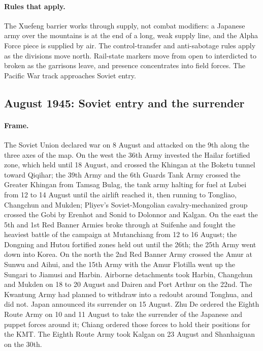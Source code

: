 \documentclass[11pt]{article}
\begin{document}
\paragraph{Rules that apply.} The Xuefeng barrier works through supply, not combat modifiers: a Japanese army over the mountains is at the end of a long, weak supply line, and the Alpha Force piece is supplied by air. The control-transfer and anti-sabotage rules apply as the divisions move north. Rail-state markers move from open to interdicted to broken as the garrisons leave, and presence concentrates into field forces. The Pacific War track approaches Soviet entry.
\clearpage


\clearpage
{}
\subsection{August 1945: Soviet entry and the surrender}
\paragraph{Frame.} The Soviet Union declared war on 8 August and attacked on the 9th along the three axes of the map. On the west the 36th Army invested the Hailar fortified zone, which held until 18 August, and crossed the Khingan at the Boketu tunnel toward Qiqihar; the 39th Army and the 6th Guards Tank Army crossed the Greater Khingan from Tamsag Bulag, the tank army halting for fuel at Lubei from 12 to 14 August until the airlift reached it, then running to Tongliao, Changchun and Mukden; Pliyev's Soviet-Mongolian cavalry-mechanized group crossed the Gobi by Erenhot and Sonid to Dolonnor and Kalgan. On the east the 5th and 1st Red Banner Armies broke through at Suifenhe and fought the heaviest battle of the campaign at Mutanchiang from 12 to 16 August; the Dongning and Hutou fortified zones held out until the 26th; the 25th Army went down into Korea. On the north the 2nd Red Banner Army crossed the Amur at Sunwu and Aihui, and the 15th Army with the Amur Flotilla went up the Sungari to Jiamusi and Harbin. Airborne detachments took Harbin, Changchun and Mukden on 18 to 20 August and Dairen and Port Arthur on the 22nd. The Kwantung Army had planned to withdraw into a redoubt around Tonghua, and did not. Japan announced its surrender on 15 August. Zhu De ordered the Eighth Route Army on 10 and 11 August to take the surrender of the Japanese and puppet forces around it; Chiang ordered those forces to hold their positions for the KMT. The Eighth Route Army took Kalgan on 23 August and Shanhaiguan on the 30th.
\end{document}
